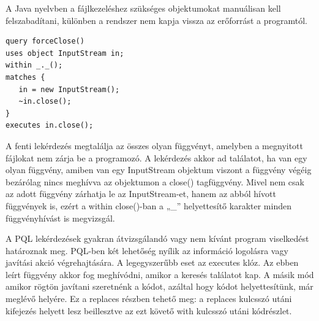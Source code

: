 \documentclass[a4paper,12pt]{report}
\begin{document}
A Java nyelvben a fájlkezeléshez szükséges objektumokat manuálisan kell felszabadítani, különben a rendszer nem kapja vissza az erőforrást a programtól.
\begin{verbatim}
query forceClose()
uses object InputStream in;
within _._();
matches {
   in = new InputStream();
   ~in.close();
}
executes in.close();
\end{verbatim} 
A fenti lekérdezés megtalálja az összes olyan függvényt, amelyben a megnyitott fájlokat nem zárja be a programozó. A lekérdezés akkor ad találatot, ha van egy olyan függvény, amiben van egy InputStream objektum viszont a függvény végéig bezárólag nincs meghívva az objektumon a close() tagfüggvény. Mivel nem csak az adott függvény zárhatja le az InputStream-et, hanem az abból hívott függvények is, ezért a within close()-ban a „\_” helyettesítő karakter minden függvényhívást is megvizsgál.
\par A PQL lekérdezések gyakran átvizsgálandó vagy nem kívánt program viselkedést határoznak meg. PQL-ben két lehetőség nyílik az információ logolásra vagy javítási akció végrehajtására. A legegyszerűbb eset az executes klóz. Az ebben leírt függvény akkor fog meghívódni, amikor a keresés találatot kap. A másik mód amikor rögtön javítani szeretnénk a kódot, azáltal hogy kódot helyettesítünk, már meglévő helyére. Ez a replaces részben tehető meg: a replaces kulcsszó utáni kifejezés helyett lesz beillesztve az ezt követő with kulcsszó utáni kódrészlet.
\end{document}
